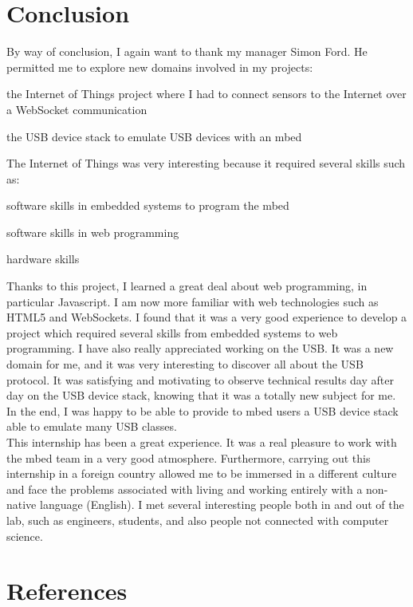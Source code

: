 \documentclass[pdftex,10pt,a4paper]{report}
\newenvironment{packed_item}{
\begin{itemize}
  \setlength{\itemsep}{1pt}
  \setlength{\parskip}{0pt}
  \setlength{\parsep}{0pt}
}{\end{itemize}}
\begin{document}
\chapter{Conclusion}
By way of conclusion, I again want to thank my manager Simon Ford. He permitted me to explore new domains involved in my projects:
\begin{packed_item}
	\item the Internet of Things project where I had to connect sensors to the Internet over a WebSocket communication
	\item the USB device stack to emulate USB devices with an mbed
\end{packed_item}

The Internet of Things was very interesting because it required several skills such as:
\begin{packed_item}
	\item software skills in embedded systems to program the mbed
	\item software skills in web programming
	\item hardware skills
\end{packed_item}


Thanks to this project, I learned a great deal about web programming, in particular Javascript. I am now more familiar with web technologies such as HTML5 and WebSockets. I found that it was a very good experience to develop a project which required several skills from embedded systems to web programming. I have also really appreciated working on the USB. It was a new domain for me, and it was very interesting to discover all about the USB protocol. It was satisfying and motivating to observe technical results day after day on the USB device stack, knowing that it was a totally new subject for me. In the end, I was happy to be able to provide to mbed users a USB device stack able to emulate many USB classes. \\


This internship has been a great experience. It was a real pleasure to work with the mbed team in a very good atmosphere. Furthermore, carrying out this
internship in a foreign country allowed me to be immersed in a different culture and face the problems associated with living and working entirely with a non-native language (English). I met several interesting people both in and out of the lab, such as engineers, students, and also people not connected with computer science.




\chapter*{References}
\end{document}
